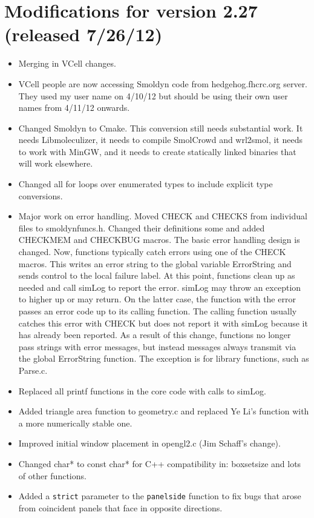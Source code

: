 \documentclass {scrbook}
\newcommand {\ttt} {\texttt}
\begin{document}
\section{Modifications for version 2.27 (released 7/26/12)}
\begin{itemize}
\item Merging in VCell changes.
\item VCell people are now accessing Smoldyn code from hedgehog.fhcrc.org server. They used my user name on 4/10/12 but should be using their own user names from 4/11/12 onwards.
\item Changed Smoldyn to Cmake. This conversion still needs substantial work. It needs Libmoleculizer, it needs to compile SmolCrowd and wrl2smol, it needs to work with MinGW, and it needs to create statically linked binaries that will work elsewhere.
\item Changed all for loops over enumerated types to include explicit type conversions.
\item Major work on error handling. Moved CHECK and CHECKS from individual files to smoldynfuncs.h. Changed their definitions some and added CHECKMEM and CHECKBUG macros. The basic error handling design is changed. Now, functions typically catch errors using one of the CHECK macros. This writes an error string to the global variable ErrorString and sends control to the local failure label. At this point, functions clean up as needed and call simLog to report the error. simLog may throw an exception to higher up or may return. On the latter case, the function with the error passes an error code up to its calling function. The calling function usually catches this error with CHECK but does not report it with simLog because it has already been reported. As a result of this change, functions no longer pass strings with error messages, but instead messages always transmit via the global ErrorString function. The exception is for library functions, such as Parse.c.
\item Replaced all printf functions in the core code with calls to simLog.
\item Added triangle area function to geometry.c and replaced Ye Li's function with a more numerically stable one.
\item Improved initial window placement in opengl2.c (Jim Schaff's change).
\item Changed char* to const char* for C++ compatibility in: boxsetsize and lots of other functions.
\item Added a \ttt{strict} parameter to the \ttt{panelside} function to fix bugs that arose from coincident panels that face in opposite directions.

\end{itemize}
\end{document}
